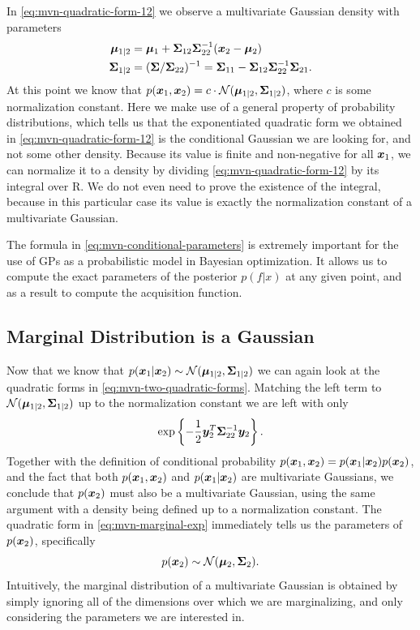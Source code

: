 In \autoref{eq:mvn-quadratic-form-12} we observe a multivariate Gaussian density with
parameters
\begin{align}
  {\boldsymbol{\mu}}_{1|2} &= {\boldsymbol{\mu}}_1 + {\bm{\Sigma}}_{12}{\bm{\Sigma}}_{22}^{-1} ({\boldsymbol{x}}_2 - {\boldsymbol{\mu}}_2) \\
  {\bm{\Sigma}}_{1|2} &= ({\bm{\Sigma}}/{\bm{\Sigma}}_{22})^{-1} =  {{\bm{\Sigma}}_{11}} - {{\bm{\Sigma}}_{12}} {\bm{\Sigma}}_{22}^{-1} {{\bm{\Sigma}}_{21}}.
  \label{eq:mvn-conditional-parameters}
\end{align}
At this point we know that $p({\boldsymbol{x}}_1, {\boldsymbol{x}}_2) = c \cdot \mathcal{N}({\boldsymbol{\mu}}_{1|2}, {\bm{\Sigma}}_{1|2})$, where $c$ is some normalization constant. Here we make use of a general property of probability distributions, which tells us that the exponentiated quadratic form we obtained in \autoref{eq:mvn-quadratic-form-12} is the conditional Gaussian we are looking for, and not some other density. Because its value is finite and non-negative for all ${\boldsymbol{x}}_1$, we can normalize it to a density by dividing \autoref{eq:mvn-quadratic-form-12} by its integral over $\mathrm{R}$. We do not even need to prove the existence of the integral, because in this particular case its value is exactly the normalization constant of a multivariate Gaussian.

The formula in \autoref{eq:mvn-conditional-parameters} is extremely important for the use of GPs as a probabilistic
model in Bayesian optimization. It allows us to compute the exact
parameters of the posterior $p(f|x)$ at any given point, and as a result
to compute the acquisition function.

\subsection{Marginal Distribution is a Gaussian}

Now that we know that $p({\boldsymbol{x}}_1 | {\boldsymbol{x}}_2) \sim \mathcal{N}({\boldsymbol{\mu}}_{1|2}, {\bm{\Sigma}}_{1|2})$ we can again look at the quadratic forms in \autoref{eq:mvn-two-quadratic-forms}. Matching the left term to $\mathcal{N}({\boldsymbol{\mu}}_{1|2}, {\bm{\Sigma}}_{1|2})$ up to the normalization constant we are left with only
$$
\exp \left\lbrace -\frac{1}{2} {\boldsymbol{y}}_2^T {\bm{\Sigma}}_{22}^{-1} {\boldsymbol{y}}_2 \right\rbrace.
\label{eq:mvn-marginal-exp}
$$
Together with the definition of conditional probability $p({\boldsymbol{x}}_1, {\boldsymbol{x}}_2) = p({\boldsymbol{x}}_1 | {\boldsymbol{x}}_2) p({\boldsymbol{x}}_2)$, and the fact that both $p({\boldsymbol{x}}_1, {\boldsymbol{x}}_2)$ and $p({\boldsymbol{x}}_1 | {\boldsymbol{x}}_2)$ are multivariate Gaussians, we conclude that $p({\boldsymbol{x}}_2)$ must also be a multivariate Gaussian, using the same argument with a density being defined up to a normalization constant.
The quadratic form in \autoref{eq:mvn-marginal-exp} immediately tells us the parameters of $p({\boldsymbol{x}}_2)$, specifically
$$
	p({\boldsymbol{x}}_2) \sim \mathcal{N}({\boldsymbol{\mu}}_2, {\bm{\Sigma}}_2).
	\label{eq:mvn-marginal-parameters}
$$
Intuitively, the marginal distribution of a multivariate Gaussian is obtained by simply ignoring all of the dimensions over which we are marginalizing, and only considering the parameters we are interested in.


